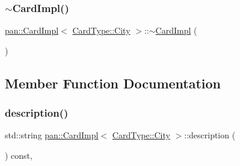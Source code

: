 \mbox{\label{classpan_1_1_card_impl_3_01_card_type_1_1_city_01_4_afae904aca39e8e484641db88448e308c}} 
\subsubsection{\texorpdfstring{$\sim$\+Card\+Impl()}{~CardImpl()}}
{\footnotesize\ttfamily \hyperlink{classpan_1_1_card_impl}{pan\+::\+Card\+Impl}$<$ \hyperlink{namespacepan_a1f7350bfd0421afeabe9fa95c16fa811a57d056ed0984166336b7879c2af3657f}{Card\+Type\+::\+City} $>$\+::$\sim$\hyperlink{classpan_1_1_card_impl}{Card\+Impl} (\begin{DoxyParamCaption}{ }\end{DoxyParamCaption})\hspace{0.3cm}{\ttfamily [default]}}



\subsection{Member Function Documentation}
\mbox{\label{classpan_1_1_card_impl_3_01_card_type_1_1_city_01_4_a326c3eaac225bd758f19abb152deffe4}} 
\subsubsection{\texorpdfstring{description()}{description()}}
{\footnotesize\ttfamily std\+::string \hyperlink{classpan_1_1_card_impl}{pan\+::\+Card\+Impl}$<$ \hyperlink{namespacepan_a1f7350bfd0421afeabe9fa95c16fa811a57d056ed0984166336b7879c2af3657f}{Card\+Type\+::\+City} $>$\+::description (\begin{DoxyParamCaption}{ }\end{DoxyParamCaption}) const\hspace{0.3cm}{\ttfamily [inline]}, {\ttfamily [virtual]}}



